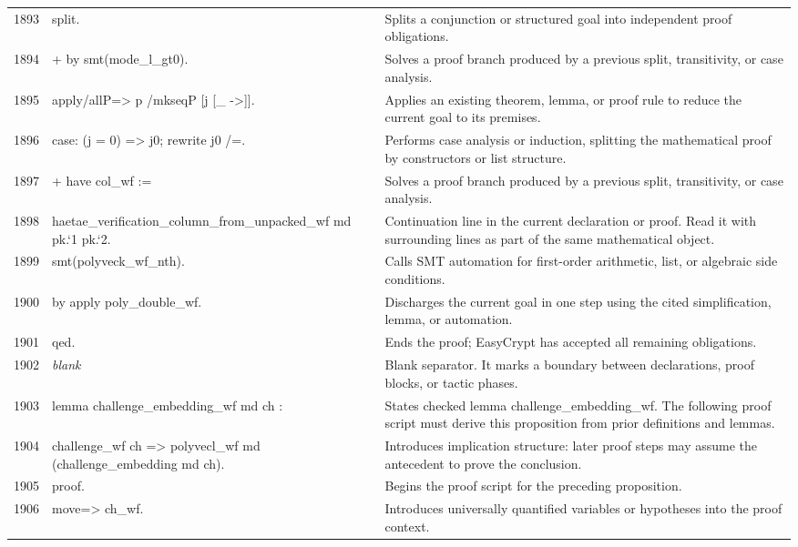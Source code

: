 \documentclass[10pt]{article}
\begin{document}
\begin{longtable}{r L{0.53\textwidth} L{0.37\textwidth}}
1893 & {\ttfamily\scriptsize split.} & Splits a conjunction or structured goal into independent proof obligations. \\
1894 & {\ttfamily\scriptsize + by smt(mode\_l\_gt0).} & Solves a proof branch produced by a previous split, transitivity, or case analysis. \\
1895 & {\ttfamily\scriptsize apply/allP=> p /mkseqP [j [\_ ->]].} & Applies an existing theorem, lemma, or proof rule to reduce the current goal to its premises. \\
1896 & {\ttfamily\scriptsize case: (j = 0) => j0; rewrite j0 /=.} & Performs case analysis or induction, splitting the mathematical proof by constructors or list structure. \\
1897 & {\ttfamily\scriptsize + have col\_wf :=} & Solves a proof branch produced by a previous split, transitivity, or case analysis. \\
1898 & {\ttfamily\scriptsize     haetae\_verification\_column\_from\_unpacked\_wf md pk.`1 pk.`2.} & Continuation line in the current declaration or proof.  Read it with surrounding lines as part of the same mathematical object. \\
1899 & {\ttfamily\scriptsize   smt(polyveck\_wf\_nth).} & Calls SMT automation for first-order arithmetic, list, or algebraic side conditions. \\
1900 & {\ttfamily\scriptsize by apply poly\_double\_wf.} & Discharges the current goal in one step using the cited simplification, lemma, or automation. \\
1901 & {\ttfamily\scriptsize qed.} & Ends the proof; EasyCrypt has accepted all remaining obligations. \\
1902 & {\ttfamily\scriptsize \emph{blank}} & Blank separator.  It marks a boundary between declarations, proof blocks, or tactic phases. \\
1903 & {\ttfamily\scriptsize lemma challenge\_embedding\_wf md ch :} & States checked lemma challenge\_embedding\_wf.  The following proof script must derive this proposition from prior definitions and lemmas. \\
1904 & {\ttfamily\scriptsize   challenge\_wf ch => polyvecl\_wf md (challenge\_embedding md ch).} & Introduces implication structure: later proof steps may assume the antecedent to prove the conclusion. \\
1905 & {\ttfamily\scriptsize proof.} & Begins the proof script for the preceding proposition. \\
1906 & {\ttfamily\scriptsize move=> ch\_wf.} & Introduces universally quantified variables or hypotheses into the proof context. \\

\end{longtable}
\end{document}
